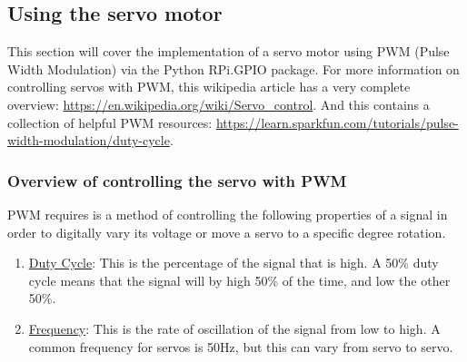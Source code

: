 \documentclass{article}
\begin{document}
  \subsection{Using the servo motor}
  This section will cover the implementation of a servo motor using PWM (Pulse Width Modulation) via the Python RPi.GPIO package. For more information on controlling servos with PWM, this wikipedia article has a very complete overview: \href{https://en.wikipedia.org/wiki/Servo\_control}{https://en.wikipedia.org/wiki/Servo\_control}. And this contains a collection of helpful PWM resources: \href{https://learn.sparkfun.com/tutorials/pulse-width-modulation/duty-cycle}{https://learn.sparkfun.com/tutorials/pulse-width-modulation/duty-cycle}.

    \subsubsection{Overview of controlling the servo with PWM}
    PWM requires is a method of controlling the following properties of a signal in order to digitally vary its voltage or move a servo to a specific degree rotation.
    \begin{enumerate}
      \item \underline{Duty Cycle}: This is the percentage of the signal that is high. A 50\% duty cycle means that the signal will by high 50\% of the time, and low the other 50\%.
      \item \underline{Frequency}: This is the rate of oscillation of the signal from low to high. A common frequency for servos is 50Hz, but this can vary from servo to servo.
    \end{enumerate}
\end{document}
